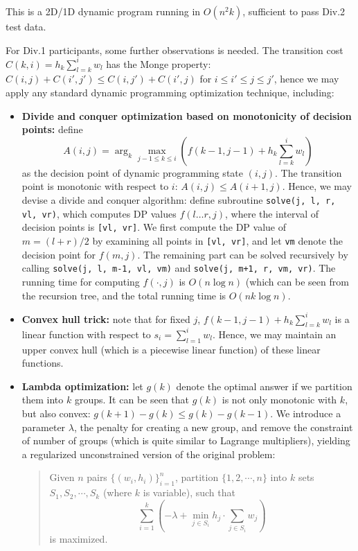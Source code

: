 \documentclass[a4paper,10.5pt,twoside]{article}
\begin{document}
This is a 2D/1D dynamic program running in $O(n^2 k)$, sufficient to pass Div.2 test data. 

For Div.1 participants, some further observations is needed. The transition cost $C(k, i) = h_{k} \sum_{l = k}^i w_l$ has the Monge property: $C(i, j) + C(i', j') \leq C(i, j') + C(i', j)$ for $i \leq i' \leq j \leq j'$, hence we may apply any standard dynamic programming optimization technique, including:

\begin{itemize}
\item \textbf{Divide and conquer optimization based on monotonicity of decision points:} define 
$$A(i, j) = \arg_k\max_{j-1 \leq k \leq i} \left( f(k-1, j-1) + h_{k} \sum_{l = k}^i w_l \right)$$
as the decision point of dynamic programming state $(i, j)$. The transition point is monotonic with respect to $i$: $A(i, j) \leq A(i+1, j)$. Hence, we may devise a divide and conquer algorithm: define subroutine \verb|solve(j, l, r, vl, vr)|, which computes DP values $f(l \ldots r, j)$, where the interval of decision points is \verb|[vl, vr]|. We first compute the DP value of $m = (l+r)/2$ by examining all points in \verb|[vl, vr]|, and let \verb|vm| denote the decision point for $f(m, j)$. The remaining part can be solved recursively by calling \verb|solve(j, l, m-1, vl, vm)| and \verb|solve(j, m+1, r, vm, vr)|. The running time for computing $f(\cdot, j)$ is $O(n \log n)$ (which can be seen from the recursion tree, and the total running time is $O(nk \log n)$.
\item \textbf{Convex hull trick:} note that for fixed $j$, $f(k-1, j-1) + h_{k} \sum_{l = k}^i w_l$ is a linear function with respect to $s_i = \sum_{l = 1}^i w_l$. Hence, we may maintain an upper convex hull (which is a piecewise linear function) of these linear functions.
\item \textbf{Lambda optimization:} let $g(k)$ denote the optimal answer if we partition them into $k$ groups. It can be seen that $g(k)$ is not only monotonic with $k$, but also convex: $g(k+1) - g(k) \leq g(k) - g(k-1)$. We introduce a parameter $\lambda$, the penalty for creating a new group, and remove the constraint of number of groups (which is quite similar to Lagrange multipliers), yielding a regularized unconstrained version of the original problem:

\begin{quote}
Given $n$ pairs $\{(w_i, h_i)\}_{i=1}^n$, partition $\{1, 2, \cdots, n\}$ into $k$ sets $S_1, S_2, \cdots, S_k$ (where $k$ is variable), such that 
$$ \sum_{i=1}^k \left(-\lambda + \min_{j \in S_i} h_j \cdot \sum_{j \in S_i} w_j\right)$$
is maximized.
\end{quote}


\end{itemize}
\end{document}
